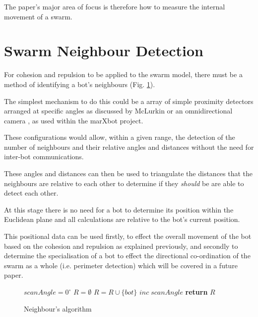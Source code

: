 \documentclass[10pt,journal,letterpaper,twoside]{IEEEtran}
\newcommand{\stability}{internal movement}
\begin{document}
The paper's major area of focus is therefore how to measure the \stability{} of a swarm.

\section{Swarm Neighbour Detection\label{section:swarmNeighbourDetection}}

For cohesion and repulsion to be applied to the swarm model, there
must be a method of identifying a bot's neighbours
(Fig. \ref{algo:neighbourDetect}).

The simplest mechanism to do this could be a array of simple proximity
detectors arranged at specific angles as discussed by McLurkin
\cite{MJ08} or an omnidirectional camera \cite{HSAUAPPRFM11},
\cite{MD07} as used within the marXbot project.

These configurations would allow, within a given range, the detection
of the number of neighbours and their relative angles and distances
without the need for inter-bot communications.

These angles and distances can then be used to triangulate the
distances that the neighbours are relative to each other to determine
if they \textit{should} be are able to detect each other.

At this stage there is no need for a bot to determine its position
within the Euclidean plane and all calculations are relative to the
bot's current position.

This positional data can be used firstly, to effect the overall
movement of the bot based on the cohesion and repulsion as explained
previously, and secondly to determine the specialisation of a bot to
effect the directional co-ordination of the swarm as a whole
(i.e. perimeter detection) which will be covered in a future paper.

\begin{figure}[H]
\begin{algorithmic}[1]
\State $scanAngle = 0^\circ$\;
\State $R = \emptyset$\;
 
   
    \State $R = R \cup \{bot\}$\;
  \EndIf
  \State $inc\; scanAngle$
\EndWhile
\State \textbf{return} $R$
\EndProcedure
\end{algorithmic}
\caption{Neighbour's algorithm}\label{algo:neighbourDetect}
\end{figure}
\end{document}
